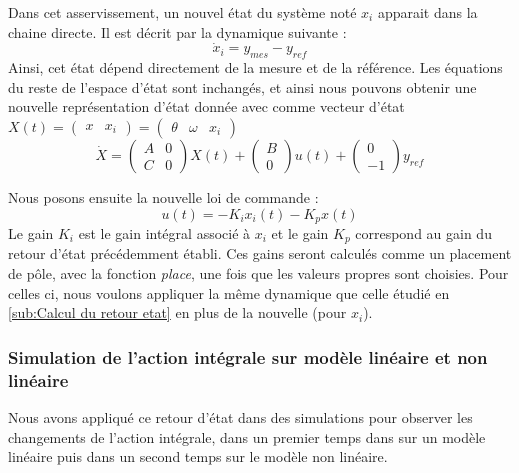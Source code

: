 		
Dans cet asservissement, un nouvel état du système noté $x_i$ apparait dans la chaine directe. Il est décrit par la dynamique suivante :
		\begin{equation}\label{eqn:dynamique_Xi}
		\dot{x}_i = y_{mes} - y_{ref}
		\end{equation}
		Ainsi, cet état dépend directement de la mesure et de la référence. Les équations du reste de l'espace d'état sont inchangés, et ainsi nous pouvons obtenir une nouvelle représentation d'état donnée avec comme vecteur d'état $X(t) = \begin{pmatrix}
		x & x_i
		\end{pmatrix} = \begin{pmatrix}
		\theta & \omega & x_i
		\end{pmatrix}$
\begin{equation}\label{eqn:EERetourIntegral}
\dot{X} = \begin{pmatrix}
A&0 \\ C& 0
\end{pmatrix}X(t) + \begin{pmatrix}
B \\ 0
\end{pmatrix}u(t) + \begin{pmatrix}
0 \\ -1
\end{pmatrix}y_{ref}
\end{equation}		
		
Nous posons ensuite la nouvelle loi de commande :\begin{equation}
		\label{eqn:loideCommande_retourIntegral}
		u(t) = -K_ix_i(t) - K_px(t)
\end{equation}
		Le gain $K_i$ est le gain intégral associé à $x_i$ et le gain $K_p$ correspond au gain du retour d'état précédemment établi. Ces gains seront calculés comme un placement de pôle, avec la fonction \emph{place}, une fois que les valeurs propres sont choisies. Pour celles ci, nous voulons appliquer la même dynamique que celle étudié en \ref{sub:Calcul du retour etat} en plus de la nouvelle (pour $x_i$).  
		\subsubsection{Simulation de l'action intégrale sur modèle linéaire et non linéaire}
		Nous avons appliqué ce retour d'état dans des simulations pour observer les changements de l'action intégrale, dans un premier temps dans sur un modèle linéaire puis dans un second temps sur le modèle non linéaire.
		

